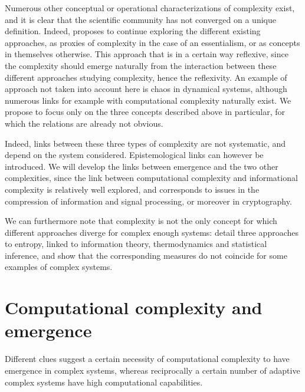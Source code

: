Numerous other conceptual or operational characterizations of complexity exist, and it is clear that the scientific community has not converged on a unique definition. Indeed, \cite{chu2008criteria} proposes to continue exploring the different existing approaches, as proxies of complexity in the case of an essentialism, or as concepts in themselves otherwise. This approach that is in a certain way reflexive, since the complexity should emerge naturally from the interaction between these different approaches studying complexity, hence the reflexivity. An example of approach not taken into account here is chaos in dynamical systems, although numerous links for example with computational complexity \cite{PROKOPENKO2019} naturally exist. We propose to focus only on the three concepts described above in particular, for which the relations are already not obvious.



Indeed, links between these three types of complexity are not systematic, and depend on the system considered. Epistemological links can however be introduced. We will develop the links between emergence and the two other complexities, since the link between computational complexity and informational complexity is relatively well explored, and corresponds to issues in the compression of information and signal processing, or moreover in cryptography.


We can furthermore note that complexity is not the only concept for which different approaches diverge for complex enough systems: \cite{thurner2017three} detail three approaches to entropy, linked to information theory, thermodynamics and statistical inference, and show that the corresponding measures do not coincide for some examples of complex systems.



\section{Computational complexity and emergence}

Different clues suggest a certain necessity of computational complexity to have emergence in complex systems, whereas reciprocally a certain number of adaptive complex systems have high computational capabilities.


